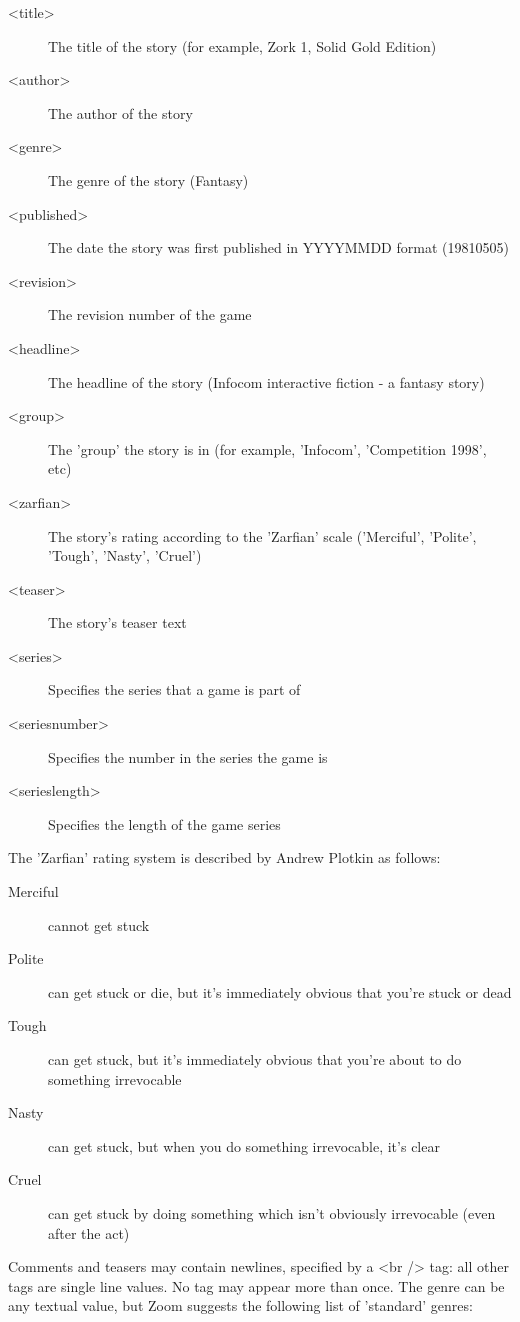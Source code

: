 \documentclass[a4paper,11pt]{article}
\begin{document}
\begin{description}
\item[<title>] The title of the story (for example, Zork 1, Solid Gold Edition)
\item[<author>] The author of the story
\item[<genre>] The genre of the story (Fantasy)
\item[<published>] The date the story was first published in YYYYMMDD format (19810505)
\item[<revision>] The revision number of the game
\item[<headline>] The headline of the story (Infocom interactive fiction - a fantasy story)
\item[<group>] The 'group' the story is in (for example, 'Infocom', 'Competition 1998', etc)
\item[<zarfian>] The story's rating according to the 'Zarfian' scale ('Merciful', 'Polite', 
'Tough', 'Nasty', 'Cruel')
\item[<teaser>] The story's teaser text
\item[<series>] Specifies the series that a game is part of
\item[<seriesnumber>] Specifies the number in the series the game is
\item[<serieslength>] Specifies the length of the game series
\end{description}

The 'Zarfian' rating system is described by Andrew Plotkin as follows:

\begin{description}
\item[Merciful] cannot get stuck
\item[Polite] can get stuck or die, but it's immediately obvious that you're stuck or dead
\item[Tough] can get stuck, but it's immediately obvious that you're about to do something 
irrevocable
\item[Nasty] can get stuck, but when you do something irrevocable, it's clear 
\item[Cruel] can get stuck by doing something which isn't obviously irrevocable (even after the act)
\end{description}

Comments and teasers may contain newlines, specified by a <br /> tag: all other tags are
single line values. No tag may appear more than once. The genre can be any textual value,
but Zoom suggests the following list of 'standard' genres:
\end{document}
